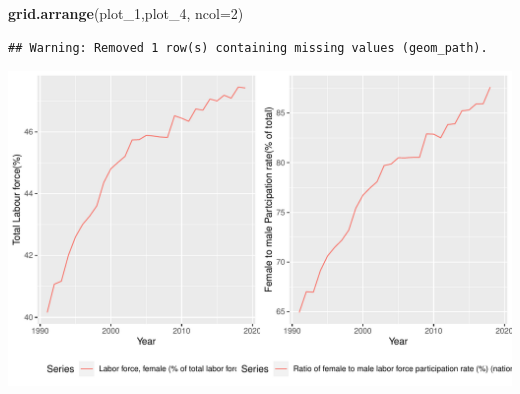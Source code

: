 \documentclass[11pt,a4paper,]{article}
\newenvironment{Shaded}{\begin{snugshade}}{\end{snugshade}}
\newcommand{\DataTypeTok}[1]{\textcolor[rgb]{0.13,0.29,0.53}{#1}}
\newcommand{\DecValTok}[1]{\textcolor[rgb]{0.00,0.00,0.81}{#1}}
\newcommand{\KeywordTok}[1]{\textcolor[rgb]{0.13,0.29,0.53}{\textbf{#1}}}
\newcommand{\NormalTok}[1]{#1}
\newcommand{\OperatorTok}[1]{\textcolor[rgb]{0.81,0.36,0.00}{\textbf{#1}}}
\newcommand{\StringTok}[1]{\textcolor[rgb]{0.31,0.60,0.02}{#1}}
\let\origfigure\figure
\let\endorigfigure\endfigure
\renewenvironment{figure}[1][2] {
    \expandafter\origfigure\expandafter[H]
} {
    \endorigfigure
}%
\begin{document}
\begin{Shaded}
\end{Shaded}

\begin{Shaded}
\begin{Highlighting}[]
\KeywordTok{grid.arrange}\NormalTok{(plot_}\DecValTok{1}\NormalTok{,plot_}\DecValTok{4}\NormalTok{, }\DataTypeTok{ncol=}\DecValTok{2}\NormalTok{)}
\end{Highlighting}
\end{Shaded}

\begin{verbatim}
## Warning: Removed 1 row(s) containing missing values (geom_path).
\end{verbatim}

\begin{figure}
\centering
\includegraphics{report_files/figure-latex/graph5-1.pdf}
\caption{\label{fig:graph5}Comparing female labour force with female-male participation rate}
\end{figure}
\end{document}
